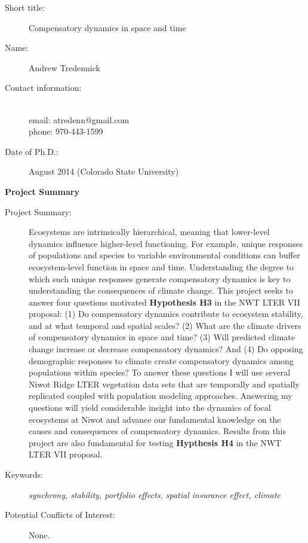 \documentclass[12pt,]{article}
\title{}
\author{}
\date{}
\begin{document}
\maketitle



\begin{description}

\item[Short title:]{Compensatory dynamics in space and time}
\item[Name:]{Andrew Tredennick}
\item[Contact information:] { ~\\
  email: atredenn@gmail.com \\
  phone: 970-443-1599}
\item[Date of Ph.D.:]{August 2014 (Colorado State University)} 

\end{description}

\newpage{}

\begin{center}
\large{\bf{Project Summary}}
\end{center}

\begin{description}
\item[Project Summary:]{
Ecosystems are intrinsically hierarchical, meaning that lower-level dynamics influence higher-level functioning.
For example, unique responses of populations and species to variable environmental conditions can buffer ecosystem-level function in space and time.
Understanding the degree to which such unique responses generate compensatory dynamics is key to understanding the consequences of climate change.
This project seeks to answer four questions motivated \textbf{Hypothesis H3} in the NWT LTER VII proposal: (1) Do compensatory dynamics contribute to ecosystem stability, and at what temporal and spatial scales? (2) What are the climate drivers of compensatory dynamics in space and time? (3) Will predicted climate change increase or decrease compensatory dynamics? And (4) Do opposing demographic responses to climate create compensatory dynamics among populations within species?
To answer these questions I will use several Niwot Ridge LTER vegetation data sets that are temporally and spatially replicated coupled with population modeling approaches.
Answering my questions will yield considerable insight into the dynamics of focal ecosystems at Niwot and advance our fundamental knowledge on the causes and consequences of compensatory dynamics.
Results from this project are also fundamental for testing \textbf{Hypthesis H4} in the NWT LTER VII proposal. 
}

\item[Keywords:]{\emph{synchrony, stability, portfolio effects, spatial insurance effect, climate}}

\item[Potential Conflicts of Interest:]{None.}
\end{description}
\end{document}
